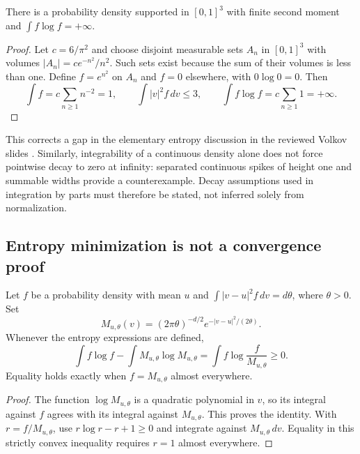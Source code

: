 \begin{proposition}
\label{prop:micro-entropy-counterexample}
There is a probability density supported in $[0,1]^3$ with finite
second moment and $\int f\log f=+\infty$.
\end{proposition}
\begin{proof}
Let $c=6/\pi^2$ and choose disjoint measurable sets $A_n$ in
$[0,1]^3$ with volumes
$|A_n|=c e^{-n^2}/n^2$.  Such sets exist because the sum of
their volumes is less than one.  Define $f=e^{n^2}$ on $A_n$
and $f=0$ elsewhere, with $0\log0=0$.  Then
\[
 \int f=c\sum_{n\ge1}n^{-2}=1,
 \qquad \int|v|^2f\,dv\le3,
 \qquad \int f\log f=c\sum_{n\ge1}1=+\infty.
\]
\end{proof}

This corrects a gap in the elementary entropy discussion in the
reviewed Volkov slides \citep{microVolkov03}.  Similarly, integrability
of a continuous density alone does not force pointwise decay to zero
at infinity: separated continuous spikes of height one and summable
widths provide a counterexample.  Decay assumptions used in
integration by parts must therefore be stated, not inferred solely
from normalization.

\subsection{Entropy minimization is not a convergence proof}

\begin{proposition}
\label{prop:micro-maxwell}
Let $f$ be a probability density with mean $u$ and
$\int|v-u|^2f\,dv=d\theta$, where $\theta>0$.  Set
\[
 M_{u,\theta}(v)=(2\pi\theta)^{-d/2}
       e^{-|v-u|^2/(2\theta)}.
\]
Whenever the entropy expressions are defined,
\[
 \int f\log f-\int M_{u,\theta}\log M_{u,\theta}
 =\int f\log\frac{f}{M_{u,\theta}}\ge0.
\]
Equality holds exactly when $f=M_{u,\theta}$ almost everywhere.
\end{proposition}
\begin{proof}
The function $\log M_{u,\theta}$ is a quadratic polynomial in
$v$, so its integral against $f$ agrees with its integral against
$M_{u,\theta}$.  This proves the identity.  With
$r=f/M_{u,\theta}$, use $r\log r-r+1\ge0$ and integrate
against $M_{u,\theta}\,dv$.  Equality in this strictly convex
inequality requires $r=1$ almost everywhere.
\end{proof}

